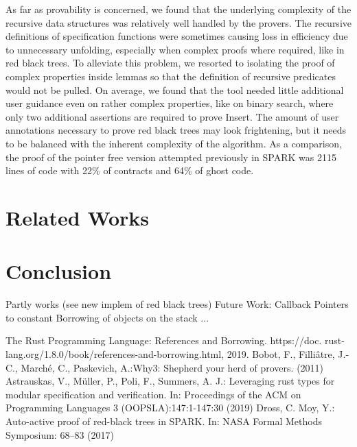 \documentclass[runningheads]{llncs}
\begin{document}
As far as provability is concerned, we found that the underlying complexity of the recursive data structures was relatively well handled by the provers. The recursive definitions of specification functions were sometimes causing loss in efficiency due to unnecessary unfolding, especially when complex proofs where required, like in red black trees. To alleviate this problem, we resorted to isolating the proof of complex properties inside lemmas so that the definition of recursive predicates would not be pulled. On average, we found that the tool needed little additional user guidance even on rather complex properties, like on binary search, where only two additional assertions are required to prove Insert. The amount of user annotations necessary to prove red black trees may look frightening, but it needs to be balanced with the inherent complexity of the algorithm. As a comparison, the proof of the pointer free version attempted previously in SPARK was 2115 lines of code with 22\% of contracts and 64\% of ghost code.

\section{Related Works}
\section{Conclusion}
Partly works (see new implem of red black trees)
Future Work:
Callback
Pointers to constant
Borrowing of objects on the stack
...

%
%
%
% 
% 
%
\begin{thebibliography}{8}
  The Rust Programming Language: References and Borrowing. https://doc.
rust-lang.org/1.8.0/book/references-and-borrowing.html, 2019.
  Bobot, F., Filli{\^a}tre, J.-C., March{\'e}, C., Paskevich, A.:Why3: Shepherd your herd of provers. (2011)
  Astrauskas, V., M\"uller, P., Poli, F., Summers, A. J.: Leveraging rust types for modular specification and verification.
  In: Proceedings of the ACM on Programming Languages 3 (OOPSLA):147:1-147:30 (2019)
  Dross, C. Moy, Y.: Auto-active proof of red-black trees in SPARK.
  In: NASA Formal Methods Symposium: 68--83 (2017)
\end{thebibliography}
\end{document}

